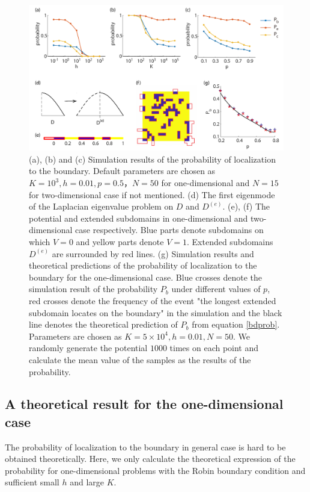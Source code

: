 \documentclass[a4paper,11pt]{article}
\begin{document}
\begin{figure}
\centering
\includegraphics[width=\linewidth]{Fig3}
\caption{(a), (b) and (c) Simulation results of the probability of localization to the boundary. Default parameters are chosen as $K = 10^3, h = 0.01, p = 0.5， N = 50$ for one-dimensional and $N = 15$ for two-dimensional case if not mentioned. (d) The first eigenmode of the Laplacian eigenvalue problem on $D$ and $D^{(e)}$. (e), (f) The potential and extended subdomains in one-dimensional and two-dimensional case respectively. Blue parts denote subdomains on which $V = 0$ and yellow parts denote $V = 1$. Extended subdomains $D^{(e)}$ are surrounded by red lines. (g) Simulation results and theoretical predictions of the probability of localization to the boundary for the one-dimensional case. Blue crosses denote the simulation result of the probability $P_b$ under different values of $p$, red crosses denote the frequency of the event "the longest extended subdomain locates on the boundary" in the simulation and the black line denotes the theoretical prediction of $P_b$ from equation \eqref{bdprob}. Parameters are chosen as $K = 5 \times 10^4, h = 0.01, N = 50$. We randomly generate the potential $1000$ times on each point and calculate the mean value of the samples as the results of the probability.}
\label{fig3}
\end{figure}

\subsection{A theoretical result for the one-dimensional case}

The probability of localization to the boundary in general case is hard to be obtained theoretically. Here, we only calculate the theoretical expression of the probability for one-dimensional problems with the Robin boundary condition and sufficient small $h$ and large $K$.
\end{document}
